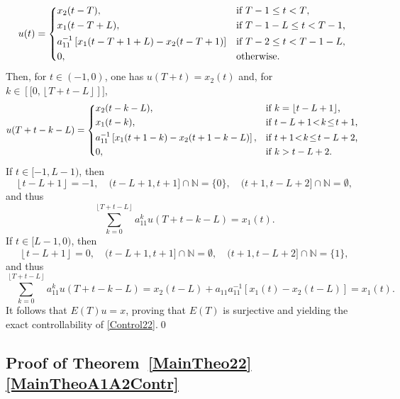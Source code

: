\documentclass[10pt]{article}
\newcommand{\llbracket}{[\![}
\newcommand{\rrbracket}{]\!]}
\theoremstyle{plain}
\theoremstyle{definition}
\newcommand{\floor}[1]{\left\lfloor #1 \right\rfloor}
\numberwithin{equation}{section}\numberwithin{figure}{section}\emergencystretch=3em
\begin{document}
\[
u(t) =
\begin{dcases*}
x_2(t - T), & if $T - 1 \leq t < T$, \\
x_1(t - T + L), & if $T - 1 - L \leq t < T - 1$, \\
a_{11}^{-1} \left[x_1(t - T + 1 + L) - x_2(t - T + 1)\right] & if $T - 2 \leq t < T - 1 - L$, \\
0, & otherwise.
\end{dcases*}
\]
Then, for $t \in (-1, 0)$, one has $u(T + t) = x_2(t)$ and, for $k \in \left\llbracket 0, \floor{T + t - L}\right\rrbracket$,
\[
u(T + t - k - L) =
\begin{dcases*}
x_2(t - k - L), & if $k = \floor{t - L + 1}$, \\
x_1(t - k), & if $t - L + 1 \!<\! k \!\leq\! t + 1$, \\
a_{11}^{-1} \left[x_1(t + 1 - k) - x_2(t + 1 - k - L)\right], & if $t + 1 \!<\! k \!\leq\! t - L + 2$, \\
0, & if $k > t - L + 2$.
\end{dcases*}
\]
If $t \in [-1, L - 1)$, then
\[
\floor{t - L + 1} = -1,\quad (t - L + 1, t + 1] \cap \mathbb N = \{0\},\quad (t + 1, t - L + 2] \cap \mathbb N = \emptyset,
\]
and thus
\[
\sum_{k=0}^{\floor{T + t - L}} a_{11}^k u(T + t - k - L) = x_1(t).
\]
If $t \in [L - 1, 0)$, then
\[
\floor{t - L + 1} = 0,\quad (t - L + 1, t + 1] \cap \mathbb N = \emptyset,\quad (t + 1, t - L + 2] \cap \mathbb N = \{1\},
\]
and thus
\[
\sum_{k=0}^{\floor{T + t - L}} a_{11}^k u(T + t - k - L) = x_2(t - L) + a_{11} a_{11}^{-1} \left[x_1(t) - x_2(t - L)\right] = x_1(t).
\]
It follows that $E(T) u = x$, proving that $E(T)$ is surjective and yielding the exact controllability of \eqref{Control22}.\qed

\subsection{Proof of Theorem~\ref{MainTheo22}\eqref{MainTheoA1A2Contr}}
\label{SecProofCaseC}
\end{document}
